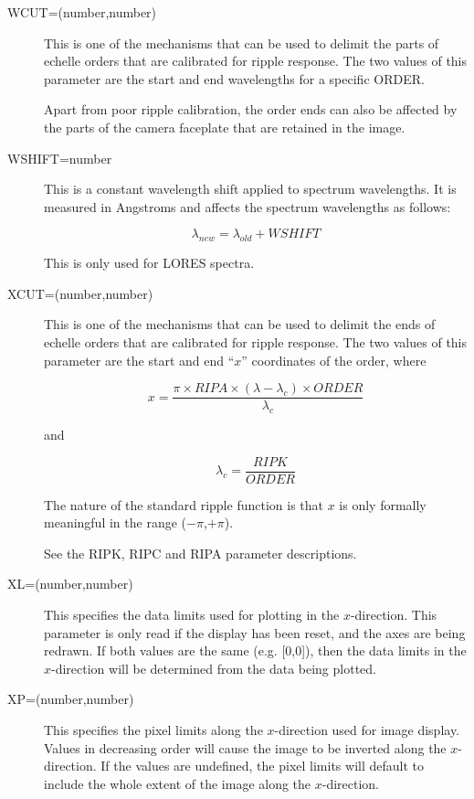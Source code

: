 \begin {description}
\item [WCUT=(number,number)]
This is one of the mechanisms that can be used to delimit the
parts of echelle orders that are calibrated for ripple response.
The two values of this parameter are the start and end wavelengths
for a specific ORDER.

Apart from poor ripple calibration, the order ends can also be affected
by the parts of the camera faceplate that are retained in the image.

\item [WSHIFT=number]
This is a constant wavelength shift applied to spectrum wavelengths.
It is measured in Angstroms and affects the spectrum wavelengths as follows:

\begin {equation}
\lambda_{new} = \lambda_{old} + WSHIFT
\end {equation}

This is only used for LORES spectra.

\item [XCUT=(number,number)]
This is one of the mechanisms that can be used to delimit the
ends of echelle orders that are calibrated for ripple response.
The two values of this parameter are the start and end ``$x$'' coordinates
of the order, where

\begin {equation}
x = \frac {\pi \times RIPA \times (\lambda - \lambda_c) \times ORDER}
{\lambda_c}
\end {equation}

and

\begin {equation}
\lambda_c = \frac {RIPK}{ORDER}
\end {equation}

The nature of the standard ripple function is that $x$ is only
formally meaningful in the range ($-\pi$,$+\pi$).

See the RIPK, RIPC and RIPA parameter descriptions.

\item [XL=(number,number)]
This specifies the data limits used for plotting in the $x$-direction.
This parameter is only read if the display has been reset, and
the axes are being redrawn.
If both values are the same (e.g. [0,0]),
then the data limits in the $x$-direction will be determined from the
data being plotted.

\item [XP=(number,number)]
This specifies the pixel limits along the $x$-direction used for
image display.
Values in decreasing order will cause the image to be inverted
along the $x$-direction.
If the values are undefined, the pixel limits will default to include
the whole extent of the image along the $x$-direction.


\end{description}
